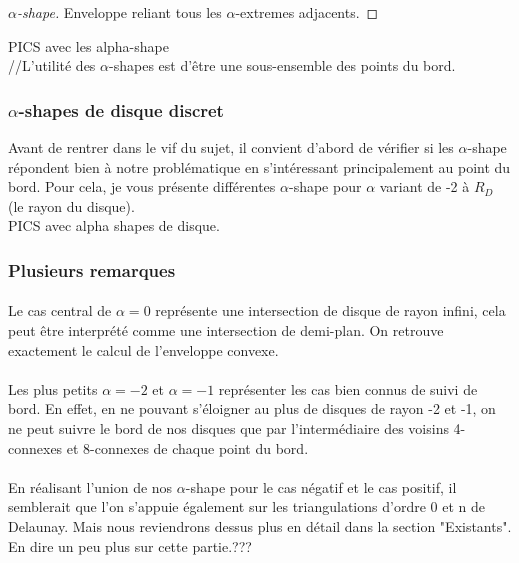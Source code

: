 \begin{proof}[$\alpha$-shape]
      Enveloppe reliant tous les $\alpha$-extremes adjacents.
\end{proof}

PICS avec les alpha-shape\\

//L'utilité des $\alpha$-shapes est d'être une sous-ensemble des points du bord.

\subsubsection{$\alpha$-shapes de disque discret}

Avant de rentrer dans le vif du sujet, il convient d'abord de vérifier si les $\alpha$-shape répondent bien à notre problématique en s'intéressant principalement au point du bord. Pour cela, je vous présente différentes $\alpha$-shape pour $\alpha$ variant de -2 à $R_D$ (le rayon du disque).\\

PICS avec alpha shapes de disque.\\

\subsubsection{Plusieurs remarques}

\paragraph{}
Le cas central de $\alpha = 0$ représente une intersection de disque de rayon infini, cela peut être interprété comme une intersection de demi-plan. On retrouve exactement le calcul de l'enveloppe convexe.

\paragraph{}
Les plus petits $\alpha = -2$ et $\alpha = -1$ représenter les cas bien connus de suivi de bord. En effet, en ne pouvant s'éloigner au plus de disques de rayon -2 et -1, on ne peut suivre le bord de nos disques que par l'intermédiaire des voisins 4-connexes et 8-connexes de chaque point du bord.

\paragraph{}
En réalisant l'union de nos $\alpha$-shape pour le cas négatif et le cas positif, il semblerait que l'on s'appuie également sur les triangulations d'ordre 0 et n de Delaunay. Mais nous reviendrons dessus plus en détail dans la section "Existants".\\

En dire un peu plus sur cette partie.???
